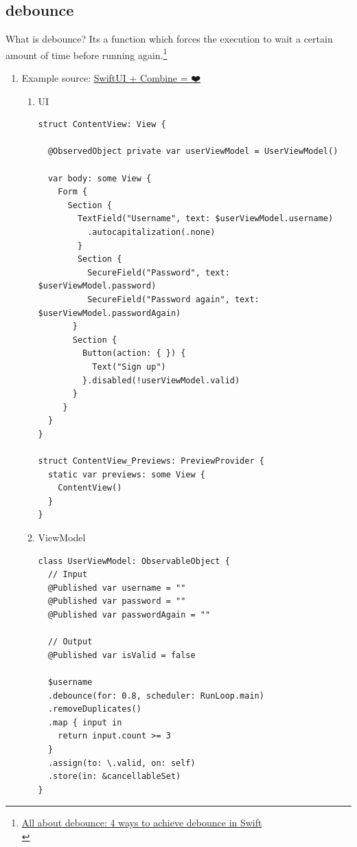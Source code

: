 \documentclass[a4paper,12pt]{article}
\begin{document}
\subsection{debounce}
\label{sec:orgd439309}
What is debounce? Its a function which forces the execution to wait a certain amount of time before running again.\footnote{\href{https://medium.com/tarkalabs/all-about-debounce-4-ways-to-achieve-debounce-in-swift-e8f8ce22f544}{All about debounce: 4 ways to achieve debounce in Swift}\\}\\
\begin{enumerate}
\item Example
\label{sec:org834b35e}
source: \href{https://peterfriese.dev/swift-combine-love/}{SwiftUI + Combine = ❤️}\\
\begin{enumerate}
\item UI
\label{sec:org97604e7}
\lstset{breaklines=true,language=swift,label= ,caption= ,captionpos=b,firstnumber=1,numbers=left}
\begin{lstlisting}
struct ContentView: View {

  @ObservedObject private var userViewModel = UserViewModel()

  var body: some View {
    Form {
      Section {
        TextField("Username", text: $userViewModel.username)
          .autocapitalization(.none)
        }
        Section {
          SecureField("Password", text: $userViewModel.password)
          SecureField("Password again", text: $userViewModel.passwordAgain)
       }
       Section {
         Button(action: { }) {
           Text("Sign up")
         }.disabled(!userViewModel.valid)
       }
     }
  }
}

struct ContentView_Previews: PreviewProvider {
  static var previews: some View {
    ContentView()
  }
}
\end{lstlisting}
\item ViewModel
\label{sec:org38bb688}
\lstset{breaklines=true,language=swift,label= ,caption= ,captionpos=b,firstnumber=1,numbers=left}
\begin{lstlisting}
class UserViewModel: ObservableObject {
  // Input
  @Published var username = ""
  @Published var password = ""
  @Published var passwordAgain = ""

  // Output
  @Published var isValid = false

  $username
  .debounce(for: 0.8, scheduler: RunLoop.main)
  .removeDuplicates()
  .map { input in
    return input.count >= 3
  }
  .assign(to: \.valid, on: self)
  .store(in: &cancellableSet)
}
\end{lstlisting}
\end{enumerate}
\end{enumerate}
\end{document}
